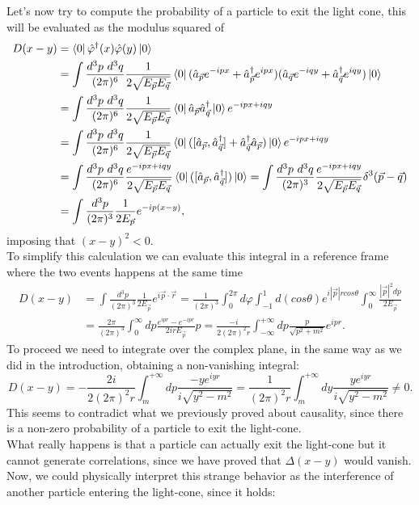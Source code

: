 Let's now try to compute the probability of a particle to exit the light cone, this will be evaluated as the modulus squared of
\begin{align*}
    D(x-y)&=\bra{0}\hat\varphi^\dagger(x)\hat\varphi(y)\ket{0}\\&=\int\frac{d^3p\ d^3q}{(2\pi)^6}\frac{1}{2\sqrt{E_{\vec p}E_{\vec q}}}\bra{0}(\hat{a}_{\vec p}e^{-ipx}+\hat{a}^\dagger_{\vec p}e^{ipx})(\hat{a}_{\vec q}e^{-iqy}+\hat{a}^\dagger_{\vec q}e^{iqy})\ket{0}\\&=\int\frac{d^3p\ d^3q}{(2\pi)^6}\frac{1}{2\sqrt{E_{\vec p}E_{\vec q}}}\bra{0}\hat{a}_{\vec p}\hat{a}^\dagger_{\vec q}\ket{0}e^{-ipx+iqy}\\&=\int\frac{d^3p\ d^3q}{(2\pi)^6}\frac{1}{2\sqrt{E_{\vec p}E_{\vec q}}}\bra{0}([\hat{a}_{\vec p},\hat{a}^\dagger_{\vec q}]+\hat{a}^\dagger_{\vec q}\hat{a}_{\vec p})\ket{0}e^{-ipx+iqy}\\&=\int\frac{d^3p\ d^3q}{(2\pi)^6}\frac{e^{-ipx+iqy}}{2\sqrt{E_{\vec p}E_{\vec q}}}\bra{0}([\hat{a}_{\vec p},\hat{a}^\dagger_{\vec q}])\ket{0}=\int\frac{d^3p\ d^3q}{(2\pi)^3}\frac{e^{-ipx+iqy}}{2\sqrt{E_{\vec p}E_{\vec q}}}\delta^3(\vec p-\vec q)\\&=\int\frac{d^3p}{(2\pi)^3}\frac{1}{2E_{\vec p}}e^{-ip(x-y)},
\end{align*}
imposing that $(x-y)^2<0$.\\
To simplify this calculation we can evaluate this integral in a reference frame where the two events happens at the same time
\begin{align*}
    D(x-y)&=\int\frac{d^3p}{(2\pi)^3}\frac{1}{2E_{\vec p}}e^{i\vec p\cdot\vec r}=\frac{1}{(2\pi)^3}\int_{0}^{2\pi}d\varphi\int_{-1}^{1}d(cos\theta)e^{i|\vec p|r cos\theta}\int_{0}^{\infty}\frac{|\vec p|^2dp}{2E_{\vec p}}\\&=\frac{2\pi}{(2\pi)^3}\int_{0}^{\infty}dp\frac{e^{ipr}-e^{-ipr}}{2irE_{\vec p}}p=\frac{-i}{2(2\pi)^2r}\int_{-\infty}^{+\infty}dp\frac{p}{\sqrt{p^2+m^2}}e^{ipr}.
\end{align*}
To proceed we need to integrate over the complex plane, in the same way as we did in the introduction, obtaining a non-vanishing integral:
\begin{equation*}
    D(x-y)=-\frac{2i}{2(2\pi)^2r}\int_{m}^{+\infty}dp\frac{-ye^{iyr}}{i\sqrt{y^2-m^2}}=\frac{1}{(2\pi)^2r}\int_{m}^{+\infty}dy\frac{ye^{iyr}}{i\sqrt{y^2-m^2}}\neq0.
\end{equation*}
This seems to contradict what we previously proved about causality, since there is a non-zero probability of a particle to exit the light-cone.\\What really happens is that a particle can actually exit the light-cone but it cannot generate correlations, since we have proved that $\Delta(x-y)$ would vanish.\\Now, we could physically interpret this strange behavior as the interference of another particle entering the light-cone, since it holds:
